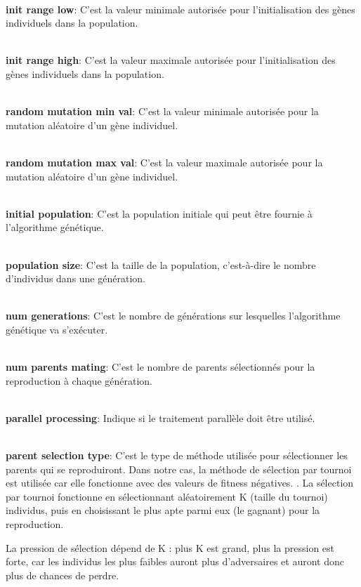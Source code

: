 \documentclass[journal, a4paper]{IEEEtran}
\begin{document}
    \\ \textbf{init range low}: C'est la valeur minimale autorisée
	pour l'initialisation des gènes individuels dans la population.

    \\ \textbf{init range high}: C'est la valeur maximale autorisée
	pour l'initialisation des gènes individuels dans la population.

    \\ \textbf{random mutation min val}: C'est la valeur minimale
	autorisée pour la mutation aléatoire d'un gène individuel.

    \\ \textbf{random mutation max val}: C'est la valeur maximale
	autorisée pour la mutation aléatoire d'un gène individuel.

    \\ \textbf{initial population}: C'est la population initiale
	qui peut être fournie à l'algorithme génétique. %

    \\ \textbf{population size}: C'est la taille de la population,
	c'est-à-dire le nombre d'individus dans une génération.

    \\ \textbf{num generations}: C'est le nombre de générations sur
	lesquelles l'algorithme génétique va s'exécuter.

    \\ \textbf{num parents mating}: C'est le nombre de parents
	sélectionnés pour la reproduction à chaque génération.

    \\ \textbf{parallel processing}: Indique si le traitement
	parallèle doit être utilisé.

    \\ \textbf{parent selection type}: C'est le type de méthode
	utilisée pour sélectionner les parents qui se reproduiront.
	Dans notre cas, la méthode de sélection par tournoi est utilisée
	car elle fonctionne avec des valeurs de fitness négatives.
	. La sélection par tournoi fonctionne en sélectionnant
	aléatoirement K (taille du tournoi) individus, puis en choisissant
	le plus apte parmi eux (le gagnant) pour la reproduction.

	La pression de sélection dépend de K : plus K est grand,
	plus la pression est forte, car les individus les plus faibles
	auront plus d'adversaires et auront donc plus de chances de perdre.
\end{document}
